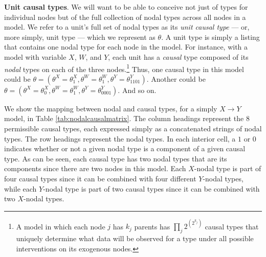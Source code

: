 \documentclass[12pt,]{book}
\let\rmarkdownfootnote\footnote%
\def\footnote{\protect\rmarkdownfootnote}
\begin{document}
\textbf{Unit causal types}. We will want to be able to conceive not just of types for individual nodes but of the full collection of nodal types across all nodes in a model. We refer to a unit's full set of nodal types as its \emph{unit causal type} --- or, more simply, unit type --- which we represent as \(\theta\). A unit type is simply a listing that contains one nodal type for each node in the model. For instance, with a model with variable \(X\), \(W\), and \(Y\), each unit has a \emph{causal} type composed of its \emph{nodal} types on each of the three nodes.\footnote{A model in which each node \(j\) has \(k_j\) parents has \(\prod_j2^{\left(2^{k_j}\right)}\) causal types that uniquely determine what data will be observed for a type under all possible interventions on its exogenous nodes.} Thus, one causal type in this model could be \(\theta = (\theta^X = \theta^X_1, \theta^W = \theta^W_1, \theta^Y = \theta^Y_{1101})\). Another could be \(\theta = (\theta^X = \theta^X_0, \theta^W = \theta^W_1, \theta^Y = \theta^Y_{0001})\). And so on.

We show the mapping between nodal and causal types, for a simply \(X \rightarrow Y\) model, in Table \ref{tab:nodalcausalmatrix}. The column headings represent the \(8\) permissible causal types, each expressed simply as a concatenated strings of nodal types. The row headings represent the nodal types. In each interior cell, a \(1\) or \(0\) indicates whether or not a given nodal type is a component of a given causal type. As can be seen, each causal type has two nodal types that are its components since there are two nodes in this model. Each \(X\)-nodal type is part of four causal types since it can be combined with four different \(Y\)-nodal types, while each \(Y\)-nodal type is part of two causal types since it can be combined with two \(X\)-nodal types.
\end{document}
